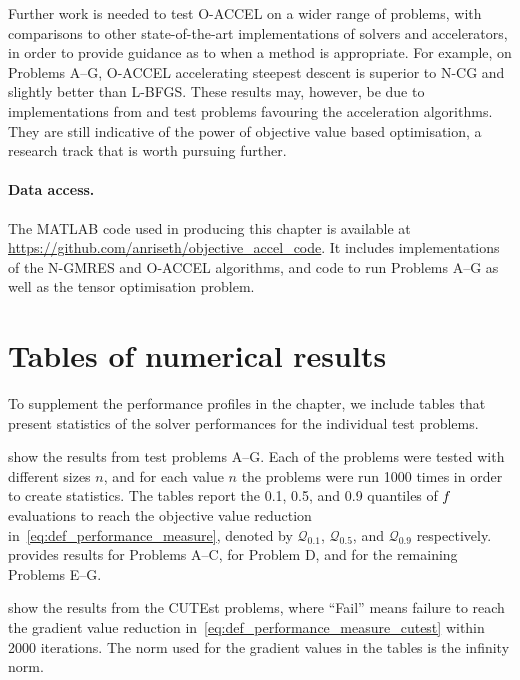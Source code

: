 \documentclass[main.tex]{subfiles}
\begin{document}
Further work is needed to test O-ACCEL on a wider range of problems,
with comparisons to other state-of-the-art implementations of solvers
and accelerators, in order to provide guidance as to when a method is
appropriate.  For example, on Problems A--G, O-ACCEL accelerating
steepest descent is superior to N-CG and slightly better than
L-BFGS. These results may, however, be due to implementations from
\citet{sterck2013steepest} and test problems favouring the
acceleration algorithms. They are still indicative of the power of
objective value based optimisation, a research track that is worth
pursuing further.


\paragraph*{Data access.}
The MATLAB code used in producing this chapter is available at
\url{https://github.com/anriseth/objective_accel_code}.  It includes
implementations of the N-GMRES and O-ACCEL algorithms, and code
to run Problems A--G as well as the tensor optimisation problem.

\section{Tables of numerical results}
To supplement the performance profiles in the chapter, we include
tables that present statistics of the solver performances for the
individual test problems.

 show the results from test problems A--G.
Each of the problems were tested with different sizes $n$, and for
each value $n$ the problems were run \num{1000} times in order to
create statistics.  The tables report the \num{0.1}, \num{0.5}, and
\num{0.9} quantiles of $f$ evaluations to reach the objective value
reduction in~\eqref{eq:def_performance_measure}, denoted by
$\mathcal{Q}_{0.1}$, $\mathcal{Q}_{0.5}$, and $\mathcal{Q}_{0.9}$
respectively.   provides results for Problems A--C,
 for Problem D,
and  for the remaining Problems E--G.

 show the results from the
CUTEst problems, where ``Fail'' means failure to reach the gradient
value reduction in~\eqref{eq:def_performance_measure_cutest} within
\num{2000} iterations.  The norm used for the gradient values in the
tables is the infinity norm.
\end{document}
